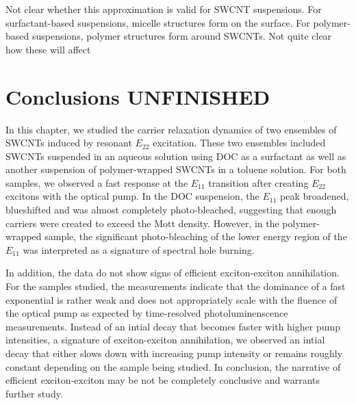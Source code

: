 Not clear whether this approximation is valid for SWCNT suspensions. For surfactant-based suspensions, micelle structures form on the surface. For polymer-based suspensions, polymer structures form around SWCNTs. Not quite clear how these will affect



\section{Conclusions {\color{red} UNFINISHED}}

In this chapter, we studied the carrier relaxation dynamics of two ensembles of SWCNTs induced by resonant $E_{22}$ excitation. These two ensembles included SWCNTs suspended in an aqueous solution using DOC as a surfactant as well as another suspension of polymer-wrapped SWCNTs in a toluene solution. For both samples, we observed a fast response at the $E_{11}$ transition after creating $E_{22}$ excitons with the optical pump. In the DOC suspension, the $E_{11}$ peak broadened, blueshifted and was almost completely photo-bleached, suggesting that enough carriers were created to exceed the Mott density. However, in the polymer-wrapped sample, the significant photo-bleaching of the lower energy region of the $E_{11}$ was interpreted as a signature of spectral hole burning.

In addition, the data do not show signs of efficient exciton-exciton annihilation. For the samples studied, the measurements indicate that the dominance of a fast exponential is rather weak and does not appropriately scale with the fluence of the optical pump as expected by time-resolved photoluminenscence measurements. Instead of an intial decay that becomes faster with higher pump intensities, a signature of exciton-exciton annihilation, we observed an intial decay that either slows down with increasing pump intensity or remains roughly constant depending on the sample being studied. In conclusion, the narrative of efficient exciton-exciton may be not be completely conclusive and warrants further study.
